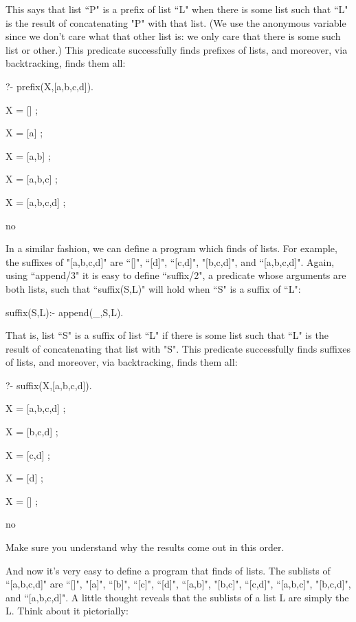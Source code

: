 This says that list ``P" is a prefix of list ``L" when there
is some list such that ``L" is the result of concatenating
"P" with that list.  (We use the anonymous variable since we
don't care what that other list is: we only care that there is some such
list or other.) This predicate successfully finds prefixes of lists,
and moreover, via backtracking, finds them all:
\begin{LPNcodedisplay}
?- prefix(X,[a,b,c,d]).

X = [] ;

X = [a] ;

X = [a,b] ;

X = [a,b,c] ;

X = [a,b,c,d] ;

no
\end{LPNcodedisplay}


In a similar fashion, we can define a program which finds
 of lists.  For example, the suffixes of
"[a,b,c,d]" are ``[]", ``[d]", ``[c,d]",
"[b,c,d]", and ``[a,b,c,d]".  Again, using ``append/3" it
is easy to define ``suffix/2", a predicate whose arguments
are both lists, such that ``suffix(S,L)" will hold when ``S"
is a suffix of ``L":
\begin{LPNcodedisplay}
suffix(S,L):- append(_,S,L).
\end{LPNcodedisplay}
That is, list ``S" is a suffix of list ``L" if there is some
list such that ``L" is the result of concatenating that list with
"S".  This predicate successfully finds suffixes of lists, and
moreover, via backtracking, finds them all:
\begin{LPNcodedisplay}
?- suffix(X,[a,b,c,d]).

X = [a,b,c,d] ;

X = [b,c,d] ;

X = [c,d] ;

X = [d] ;

X = [] ;

no
\end{LPNcodedisplay}

Make sure you understand why the results come out in this order.

\bigskip

And now it's very easy to define a program that finds
 of lists.  The sublists of ``[a,b,c,d]" are ``[]",
"[a]", ``[b]", ``[c]", ``[d]", ``[a,b]",
"[b,c]", ``[c,d]", ``[a,b,c]",
"[b,c,d]", and ``[a,b,c,d]".  A little thought reveals
that the sublists of a list L are simply the  L. Think about it pictorially:


